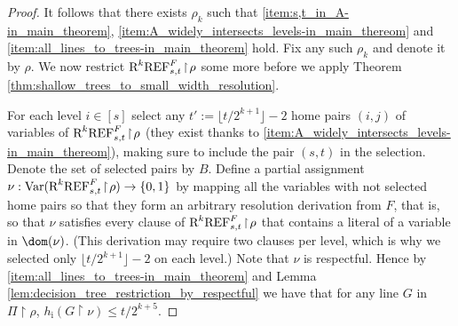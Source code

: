 \begin{proof}
It follows that there exists $\rho_k$ such that \ref{item:s,t_in_A-in_main_theorem}, \ref{item:A_widely_intersects_levels-in_main_thereom} and \ref{item:all_lines_to_trees-in_main_theorem} hold. Fix any such $\rho_k$ and denote it by $\rho$. We now restrict $\textnormal{R}^k\textnormal{REF}^{F}_{s,t} \! \restriction \! \rho$ some more before we apply Theorem \ref{thm:shallow_trees_to_small_width_resolution}.

For each level $i \in [s]$ select any $t' := \lfloor t/2^{k+1} \rfloor - 2$ home pairs $(i,j)$ of variables of $\textnormal{R}^k\textnormal{REF}^{F}_{s,t} \! \restriction \! \rho$ (they exist thanks to  \ref{item:A_widely_intersects_levels-in_main_thereom}), making sure to include the pair $(s,t)$ in the selection. Denote the set of selected pairs by $B$. Define a partial assignment $\nu: \text{Var}(\textnormal{R}^k\textnormal{REF}^{F}_{s,t} \! \restriction \! \rho) \rightarrow \{0,1\}$ by mapping all the variables with not selected home pairs so that they form an arbitrary resolution derivation from $F$, that is, so that $\nu$ satisfies every clause of $\textnormal{R}^k\textnormal{REF}^{F}_{s,t} \! \restriction \! \rho$ that contains a literal of a variable in $\dom(\nu)$. (This derivation may require two clauses per level, which is why we selected only $\lfloor t/2^{k+1} \rfloor - 2$ on each level.) Note that $\nu$ is respectful. Hence by \ref{item:all_lines_to_trees-in_main_theorem} and Lemma \ref{lem:decision_tree_restriction_by_respectful} we have that for any line $G$ in $\Pi \! \restriction \! \rho$, $h_{\text{i}}(G \! \restriction \! \nu) \leq t/2^{k+5}$.


\end{proof}
